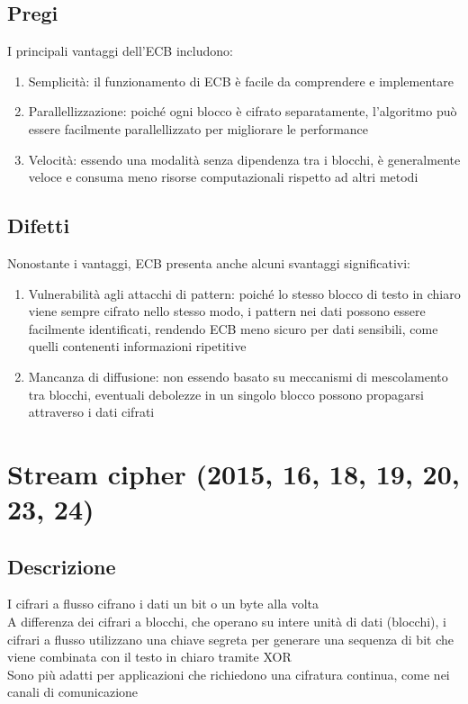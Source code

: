 \documentclass[10pt,oneside,a4paper]{article}
\begin{document}
\begin{enumerate}
\subsection{Pregi}
I principali vantaggi dell'ECB includono:
\begin{enumerate}
\item Semplicità: il funzionamento di ECB è facile da comprendere e implementare
\item Parallellizzazione: poiché ogni blocco è cifrato separatamente, l'algoritmo può essere facilmente parallellizzato per migliorare le performance
\item Velocità: essendo una modalità senza dipendenza tra i blocchi, è generalmente veloce e consuma meno risorse computazionali rispetto ad altri metodi
\end{enumerate}
\subsection{Difetti}
Nonostante i vantaggi, ECB presenta anche alcuni svantaggi significativi:
\begin{enumerate}
\item Vulnerabilità agli attacchi di pattern: poiché lo stesso blocco di testo in chiaro viene sempre cifrato nello stesso modo, i pattern nei dati possono essere facilmente identificati, rendendo ECB meno sicuro per dati sensibili, come quelli contenenti informazioni ripetitive
\item Mancanza di diffusione: non essendo basato su meccanismi di mescolamento tra blocchi, eventuali debolezze in un singolo blocco possono propagarsi attraverso i dati cifrati
\end{enumerate}
\section{Stream cipher (2015, 16, 18, 19, 20, 23, 24)}
\subsection{Descrizione}
I cifrari a flusso cifrano i dati un bit o un byte alla volta\\
A differenza dei cifrari a blocchi, che operano su intere unità di dati (blocchi), i cifrari a flusso utilizzano una chiave segreta per generare una sequenza di bit che viene combinata con il testo in chiaro tramite XOR\\
Sono più adatti per applicazioni che richiedono una cifratura continua, come nei canali di comunicazione

\end{enumerate}
\end{document}

